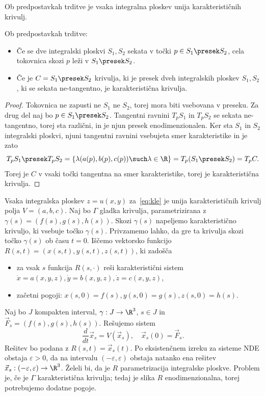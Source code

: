 
\begin{posledica}
  Ob predpostavkah trditve je vsaka integralna ploskev unija karakterističnih krivulj.
\end{posledica}

\begin{posledica}
  Ob predpostavkah trditve:
  \begin{itemize}
  \item Če se dve integralski ploskvi $S_1, S_2$ sekata v točki $p \in S_1
	\presek S_2$, cela tokovnica skozi $p$ leži v $S_1 \presek S_2$.
  \item Če je $C = S_1 \presek S_2$ krivulja, ki je presek dveh integralskih
	ploskev $S_1, S_2$, ki se sekata ne-tangentno, je karakteristična krivulja.
  \end{itemize}
\end{posledica}

\begin{proof}
  Tokovnica ne zapusti ne $S_1$ ne $S_2$, torej mora biti vsebovana v preseku.
  Za drug del naj bo $p \in S_1 \presek S_2$.
  Tangentni ravnini $T_p S_1$ in $T_p S_2$ se sekata ne-tangentno, torej sta
  različni, in je njun presek enodimenzionalen.
  Ker sta $S_1$ in $S_2$ integralski ploskvi, njuni tangentni ravnini vsebujeta
  smer karakteristike in je zato
  \[
	T_p S_1 \presek T_p S_2 = \{\lambda(a(p), b(p), c(p)) \such \lambda \in \R\}
	= T_p(S_1 \presek S_2) = T_pC.
  \]
  Torej je $C$ v vsaki točki tangentna na smer karakteristike, torej je
  karakteristična krivulja.
\end{proof}


Vsaka integralska ploskev $z = u(x, y)$ za~\eqref{eq:kle} je unija
karakterističnih krivulj polja $V = (a, b, c)$.
Naj bo $\Gamma$ gladka krivulja, parametrizirana z $\gamma(s) = (f(s), g(s),
h(s))$.
Skozi $\gamma(s)$ napeljemo karakteristično krivuljo, ki vsebuje točko
$\gamma(s)$.
Privzamemo lahko, da gre ta krivulja skozi točko $\gamma(s)$ ob času $t = 0$.
Iščemo vektorsko funkcijo $R(s, t) = (x(s, t), y(s, t), z(s, t))$, ki zadošča
\begin{itemize}
\item za vsak $s$ funkcija $R(s, \cdot)$ reši karakteristični sistem $\dot{x} =
  a(x, y, z), \dot{y} = b(x, y, z), \dot{z} = c(x, y, z)$,
\item začetni pogoji: $x(s, 0) = f(s), y(s, 0) = g(s), z(s, 0) = h(s)$.
\end{itemize}
Naj bo $J$ kompakten interval, $\gamma: J \to \R^3$, $s \in J$ in $\vec{F}_s =
(f(s), g(s), h(s))$.
Rešujemo sistem
\[
  \frac{d}{dt} \vec{x}_s = V(\vec{x}_s),\quad\vec{x}_s(0) = \vec{F}_s.
\]
Rešitev bo podana z $R(s, t) = \vec{x}_s(t)$.
Po eksistenčnem izreku za sisteme NDE obstaja $\varepsilon > 0$, da na intervalu
$(-\varepsilon, \varepsilon)$ obstaja natanko ena rešitev $\vec{x}_s:
(-\varepsilon, \varepsilon) \to \R^3$.
Želeli bi, da je $R$ parametrizacija integralske ploskve.
Problem je, če je $\Gamma$ karakteristična krivulja; tedaj je slika $R$
enodimenzionalna, torej potrebujemo dodatne pogoje.

